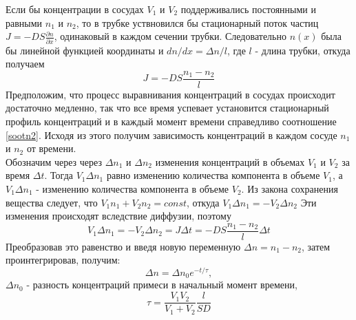 \documentclass[12pt]{article}
\begin{document}
    Если бы концентрации в сосудах $V_{1}$ и $V_{2}$ поддерживались постоянными 
    и равными $n_{1}$ и $n_2$, то в трубке уствновился бы стационарный поток 
    частиц $J = -DS\frac{\partial n}{\partial x}$, одинаковый в каждом сечении трубки.
    Следовательно $n(x)$ была бы линейной функцией координаты и $dn/dx = \Delta n/l$,
    где $l$ - длина трубки, откуда получаем
    \begin{equation}\label{sootn2}
        J = -DS\frac{n_1 - n_2}{l}
    \end{equation}
    Предположим, что процесс выравнивания концентраций в сосудах происходит
    достаточно медленно, так что все время успевает установится стационарный
    профиль концентраций и в каждый момент времени справедливо соотношение
    \ref{sootn2}. Исходя из этого получим зависимость концентраций в каждом
    сосуде $n_1$ и $n_2$ от времени.\\
    Обозначим через через $\Delta n_1$ и $\Delta n_2$ изменения концентраций
    в объемах $V_1$ и $V_2$ за время $\Delta t$. Тогда $V_1\Delta n_1$ равно 
    изменению количества компонента в объеме $V_1$, а $V_1\Delta n_1$ - 
    изменению количества компонента в объеме $V_2$. Из закона сохранения 
    вещества следует, что $V_1n_1 + V_2n_2 = const$, откуда $V_1 \Delta n_1 = - V_2\Delta n_2$
    Эти изменения происходят вследствие диффузии, поэтому 
    \begin{equation}\label{3}
        V_1\Delta n_1 = -V_2\Delta n_2 = J\Delta t = -DS\frac{n_1 - n_2}{l}\Delta t
    \end{equation}
    Преобразовав это равенство и введя новую переменную $\Delta n = n_1-n_2$,
    затем проинтегрировав, получим:
    \begin{equation}\label{6}
        \Delta n = \Delta n_0 e^{-t/\tau},
    \end{equation}
    $\Delta n_0$ - разность концентраций примеси в начальный момент времени,
    \begin{equation}\label{7}
        \tau = \frac{V_1V_2}{V_1+V_2} \frac{l}{SD}
    \end{equation}
\end{document}
